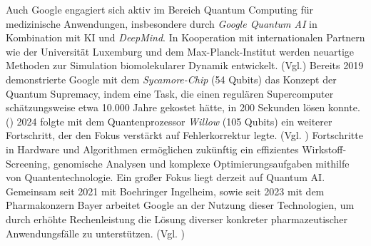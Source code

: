 Auch Google engagiert sich aktiv im Bereich Quantum Computing für medizinische Anwendungen, insbesondere durch \textit{Google Quantum AI} in Kombination mit KI und \textit{DeepMind}. In Kooperation mit internationalen Partnern wie der Universität Luxemburg und dem Max-Planck-Institut werden neuartige Methoden zur Simulation biomolekularer Dynamik entwickelt. (Vgl.\cite{unkeBiomolecularDynamicsMachinelearned2024}) 
Bereits 2019 demonstrierte Google mit dem \textit{Sycamore-Chip} (54 Qubits) das Konzept der Quantum Supremacy, indem eine Task, die einen regulären Supercomputer schätzungsweise etwa 10.000 Jahre gekostet hätte, in 200 Sekunden lösen konnte. (\cite{arute_quantum_2019}) 
2024 folgte mit dem Quantenprozessor \textit{Willow} (105 Qubits) ein weiterer Fortschritt, der den Fokus verstärkt auf Fehlerkorrektur legte. (Vgl. \cite{acharya_quantum_2025}) Fortschritte in Hardware und Algorithmen ermöglichen zukünftig ein effizientes  Wirkstoff-Screening, genomische Analysen und komplexe Optimierungsaufgaben mithilfe von Quantentechnologie. 
Ein großer Fokus liegt derzeit auf Quantum AI. Gemeinsam seit 2021 mit Boehringer Ingelheim, sowie seit 2023 mit dem Pharmakonzern Bayer arbeitet Google an der Nutzung dieser Technologien, um durch erhöhte Rechenleistung die Lösung diverser konkreter pharmazeutischer Anwendungsfälle zu unterstützen. (Vgl. \cite{ingelheimCooperationGoogleQuantum2021, BayerAccelerateDrug})
\\

